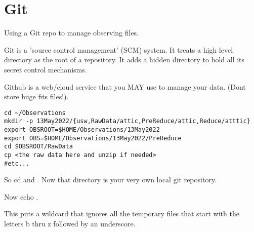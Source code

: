 \section{Git}

Using a Git repo to manage observing files.

Git is a 'source control management' (SCM) system. It treats a high
level directory as the root of a repository. It adds a hidden directory
 to hold all its secret control mechanisms.

Github is a web/cloud service that you MAY use to manage your data.
(Dont store huge fits files!). 

\begingroup \fontsize{10pt}{10pt}
\selectfont
\begin{verbatim} 
cd ~/Observations
mkdir -p 13May2022/{usw,RawData/attic,PreReduce/attic,Reduce/atttic}
export OBSROOT=$HOME/Observations/13May2022
export OBS=$HOME/Observations/13May2022/PreReduce
cd $OBSROOT/RawData
cp <the raw data here and unzip if needed>
#etc...
\end{verbatim}
\endgroup

So cd  and .
Now that directory is your very own local git repository.

Now echo .

This puts a wildcard that ignores all the temporary files
that start with the letters b thru z followed by an
underscore. 


